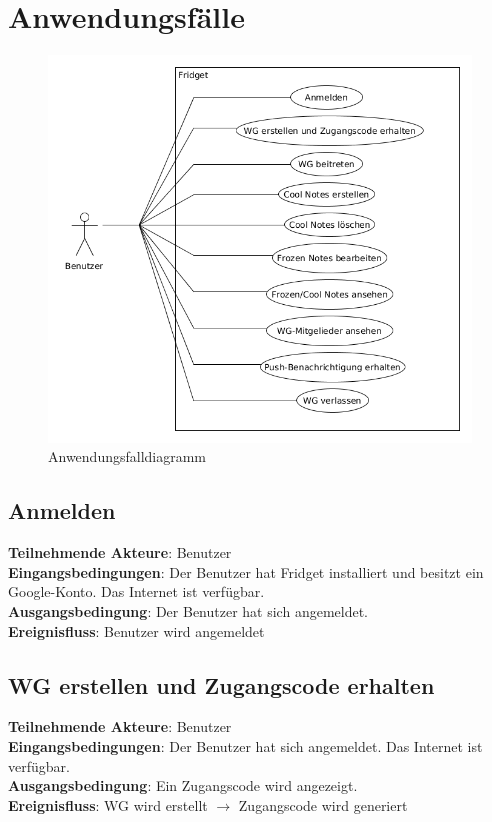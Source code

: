\documentclass[a4paper]{scrreprt}
\begin{document}
    \chapter{Anwendungsfälle}
    		\begin{figure}[h]
			\centering
			\includegraphics[scale = .6]{anwendungsfalldiagramm.png}
			\caption{Anwendungsfalldiagramm}
		\end{figure}
    		    		
        \section{Anmelden}
        \textbf{Teilnehmende Akteure}: Benutzer \\
		\textbf{Eingangsbedingungen}: Der Benutzer hat Fridget installiert und besitzt ein Google-Konto. Das Internet ist verfügbar. \\
		\textbf{Ausgangsbedingung}: Der Benutzer hat sich angemeldet. \\
		\textbf{Ereignisfluss}: Benutzer wird angemeldet
		
		\section{WG erstellen und Zugangscode erhalten}
		\textbf{Teilnehmende Akteure}: Benutzer \\
		\textbf{Eingangsbedingungen}: Der Benutzer hat sich angemeldet. Das Internet ist verfügbar. \\
		\textbf{Ausgangsbedingung}: Ein Zugangscode wird angezeigt. \\
		\textbf{Ereignisfluss}: WG wird erstellt $\rightarrow$ Zugangscode wird generiert
		
\end{document}
